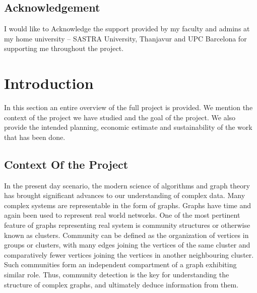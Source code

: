 \newpage
\clearpage
\newpage
\section*{Acknowledgement}
I would like to Acknowledge the support provided by my faculty and admins at my home university -- SASTRA University, Thanjavur and UPC Barcelona for supporting me throughout the project.

\newpage

\tableofcontents
\newpage

\chapter{Introduction}

\setcounter{page}{1}
\par In this section an entire overview of the full project is provided. We mention the context of the project we have studied and the goal of the project. We also provide the intended planning, economic estimate and sustainability of the work that has been done.


\section{Context Of the Project}
\par In the present day scenario, the modern science of algorithms and graph theory has brought significant advances to our understanding of complex data. Many complex systems are representable in the form of graphs. Graphs have time and again been used to represent real world networks. One of the most pertinent feature of graphs representing real system is community structures or otherwise known as clusters. Community can be defined as the organization of vertices in groups or clusters, with many edges joining the vertices of the same cluster and comparatively fewer vertices joining the vertices in another neighbouring cluster. Such communities form an independent compartment of a graph exhibiting similar role.
Thus, community detection is the key for understanding the structure of complex graphs, and ultimately deduce information from them.

